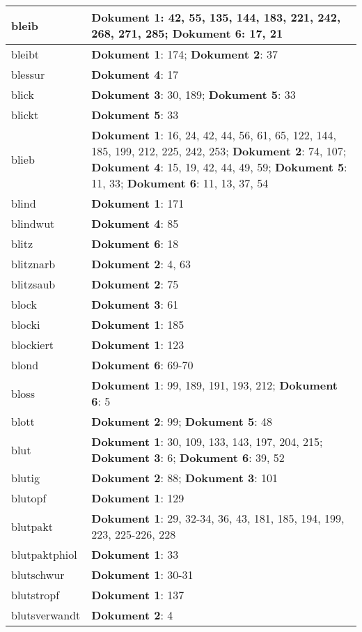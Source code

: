 \documentclass[a5paper]{article}
\begin{document}
\begin{longtable}[l]{|l|p{3in}|}
\hline
bleib & \textbf{Dokument 1}: 42, 55, 135, 144, 183, 221, 242, 268, 271, 285; \textbf{Dokument 6}: 17, 21 \\
\hline
bleibt & \textbf{Dokument 1}: 174; \textbf{Dokument 2}: 37 \\
\hline
blessur & \textbf{Dokument 4}: 17 \\
\hline
blick & \textbf{Dokument 3}: 30, 189; \textbf{Dokument 5}: 33 \\
\hline
blickt & \textbf{Dokument 5}: 33 \\
\hline
blieb & \textbf{Dokument 1}: 16, 24, 42, 44, 56, 61, 65, 122, 144, 185, 199, 212, 225, 242, 253; \textbf{Dokument 2}: 74, 107; \textbf{Dokument 4}: 15, 19, 42, 44, 49, 59; \textbf{Dokument 5}: 11, 33; \textbf{Dokument 6}: 11, 13, 37, 54 \\
\hline
blind & \textbf{Dokument 1}: 171 \\
\hline
blindwut & \textbf{Dokument 4}: 85 \\
\hline
blitz & \textbf{Dokument 6}: 18 \\
\hline
blitznarb & \textbf{Dokument 2}: 4, 63 \\
\hline
blitzsaub & \textbf{Dokument 2}: 75 \\
\hline
block & \textbf{Dokument 3}: 61 \\
\hline
blocki & \textbf{Dokument 1}: 185 \\
\hline
blockiert & \textbf{Dokument 1}: 123 \\
\hline
blond & \textbf{Dokument 6}: 69-70 \\
\hline
bloss & \textbf{Dokument 1}: 99, 189, 191, 193, 212; \textbf{Dokument 6}: 5 \\
\hline
blott & \textbf{Dokument 2}: 99; \textbf{Dokument 5}: 48 \\
\hline
blut & \textbf{Dokument 1}: 30, 109, 133, 143, 197, 204, 215; \textbf{Dokument 3}: 6; \textbf{Dokument 6}: 39, 52 \\
\hline
blutig & \textbf{Dokument 2}: 88; \textbf{Dokument 3}: 101 \\
\hline
blutopf & \textbf{Dokument 1}: 129 \\
\hline
blutpakt & \textbf{Dokument 1}: 29, 32-34, 36, 43, 181, 185, 194, 199, 223, 225-226, 228 \\
\hline
blutpaktphiol & \textbf{Dokument 1}: 33 \\
\hline
blutschwur & \textbf{Dokument 1}: 30-31 \\
\hline
blutstropf & \textbf{Dokument 1}: 137 \\
\hline
blutsverwandt & \textbf{Dokument 2}: 4 \\

\end{longtable}
\end{document}
